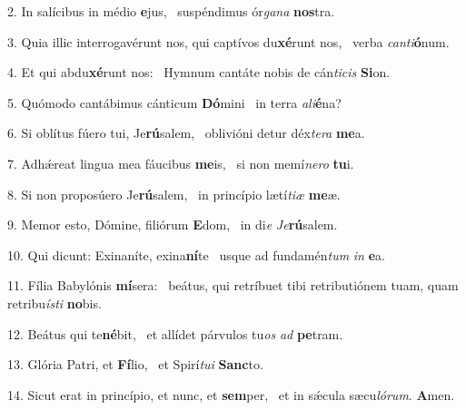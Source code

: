 2. In salícibus in médio \textbf{e}jus, \ast\  suspéndimus ór\textit{ga}\textit{na} \textbf{nos}tra.\

3. Quia illic interrogavérunt nos, qui captívos du\textbf{xé}runt nos, \ast\  verba \textit{can}\textit{ti}\textbf{ó}num.\

4. Et qui abdu\textbf{xé}runt nos: \ast\  Hymnum cantáte nobis de cán\textit{ti}\textit{cis} \textbf{Si}on.\

5. Quómodo cantábimus cánticum \textbf{Dó}mini \ast\  in terra \textit{a}\textit{li}\textbf{é}na?\

6. Si oblítus fúero tui, Je\textbf{rú}salem, \ast\  oblivióni detur déx\textit{te}\textit{ra} \textbf{me}a.\

7. Adhǽreat lingua mea fáucibus \textbf{me}is, \ast\  si non memí\textit{ne}\textit{ro} \textbf{tu}i.\

8. Si non proposúero Je\textbf{rú}salem, \ast\  in princípio lætí\textit{ti}\textit{æ} \textbf{me}æ.\

9. Memor esto, Dómine, filiórum \textbf{E}dom, \ast\  in di\textit{e} \textit{Je}\textbf{rú}salem.\

10. Qui dicunt: Exinaníte, exina\textbf{ní}te \ast\  usque ad fundamén\textit{tum} \textit{in} \textbf{e}a.\

11. Fília Babylónis \textbf{mí}sera: \ast\  beátus, qui retríbuet tibi retributiónem tuam, quam retribu\textit{ís}\textit{ti} \textbf{no}bis.\

12. Beátus qui te\textbf{né}bit, \ast\  et allídet párvulos tu\textit{os} \textit{ad} \textbf{pe}tram.\

13. Glória Patri, et \textbf{Fí}lio, \ast\  et Spirí\textit{tu}\textit{i} \textbf{Sanc}to.\

14. Sicut erat in princípio, et nunc, et \textbf{sem}per, \ast\  et in sǽcula sæcu\textit{ló}\textit{rum}. \textbf{A}men.\

